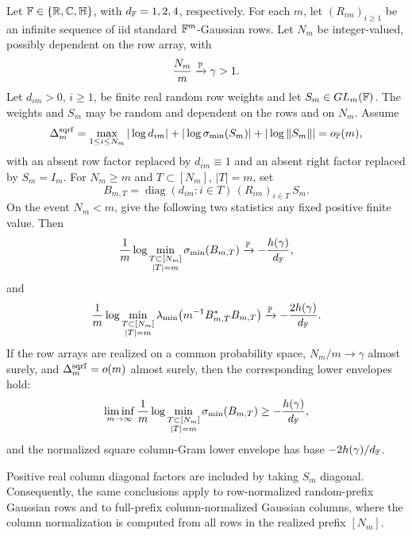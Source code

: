 \begin{corollary}\label{cor:random-prefix-square-row-right-factor-exact}\label{cor:random-prefix-square-diagonal-exact}
Let \(\mathbb{F}\in\{\mathbb{R},\mathbb{C},\mathbb{H}\}\), with \(d_{\mathbb{F}}=1,2,4\), respectively.  For each
\(m\), let \((R_{im})_{i\ge1}\) be an infinite sequence of iid standard
\(\mathbb{F}^m\)-Gaussian rows.  Let \(N_m\) be integer-valued, possibly dependent on
the row array, with
\[
  \frac{N_m}{m}\xrightarrow{\mathbb{P}}\gamma>1 .
\]
Let \(d_{im}>0\), \(i\ge1\), be finite real random row weights and let
\(S_m\in GL_m(\mathbb{F})\).  The weights and \(S_m\) may be random and dependent on
the rows and on \(N_m\).  Assume
\[
  \Delta_m^{\rm sqrf}
  =
  \max_{1\le i\le N_m}|\log d_{im}|
  +|\log\sigma_{\min}(S_m)|+|\log\|S_m\||
  =o_{\mathbb{P}}(m),
\]
with an absent row factor replaced by \(d_{im}\equiv1\) and an absent right
factor replaced by \(S_m=I_m\).  For \(N_m\ge m\) and \(T\subset[N_m]\),
\(|T|=m\), set
\[
  B_{m,T}=\operatorname{diag}(d_{im}:i\in T)\,(R_{im})_{i\in T}\,S_m .
\]
On the event \(N_m<m\), give the following two statistics any fixed positive
finite value.  Then
\[
  \frac1m\log
  \min_{\substack{T\subset[N_m]\\ |T|=m}}\sigma_{\min}(B_{m,T})
  \xrightarrow{\mathbb{P}}
  -\frac{h(\gamma)}{d_{\mathbb{F}}},
\]
and
\[
  \frac1m\log
  \min_{\substack{T\subset[N_m]\\ |T|=m}}
  \lambda_{\min}\!\left(m^{-1}B_{m,T}^*B_{m,T}\right)
  \xrightarrow{\mathbb{P}}
  -\frac{2h(\gamma)}{d_{\mathbb{F}}}.
\]
If the row arrays are realized on a common probability space,
\(N_m/m\to\gamma\) almost surely, and
\(\Delta_m^{\rm sqrf}=o(m)\) almost surely, then the corresponding lower
envelopes hold:
\[
  \liminf_{m\to\infty}\frac1m\log
  \min_{\substack{T\subset[N_m]\\ |T|=m}}\sigma_{\min}(B_{m,T})
  \ge -\frac{h(\gamma)}{d_{\mathbb{F}}},
\]
and the normalized square column-Gram lower envelope has base
\(-2h(\gamma)/d_{\mathbb{F}}\).

Positive real column diagonal factors are included by taking \(S_m\) diagonal.
Consequently, the same conclusions apply to row-normalized random-prefix
Gaussian rows and to full-prefix column-normalized Gaussian columns, where the
column normalization is computed from all rows in the realized prefix \([N_m]\).
\end{corollary}

